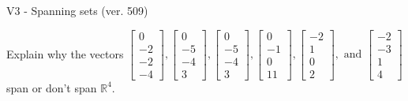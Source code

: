 \begin{exercise}
  \begin{exerciseTitle}V3 - Spanning sets (ver. 509)\end{exerciseTitle}
  \begin{exerciseStatement}
    Explain why the vectors \(\left[\begin{array}{r}
0 \\
-2 \\
-2 \\
-4
\end{array}\right] , \left[\begin{array}{r}
0 \\
-5 \\
-4 \\
3
\end{array}\right] , \left[\begin{array}{r}
0 \\
-5 \\
-4 \\
3
\end{array}\right] , \left[\begin{array}{r}
0 \\
-1 \\
0 \\
11
\end{array}\right] , \left[\begin{array}{r}
-2 \\
1 \\
0 \\
2
\end{array}\right] , \text{ and } \left[\begin{array}{r}
-2 \\
-3 \\
1 \\
4
\end{array}\right]\) span or don't span \(\mathbb{R}^4\). 
	



\end{exerciseStatement}
\end{exercise}
